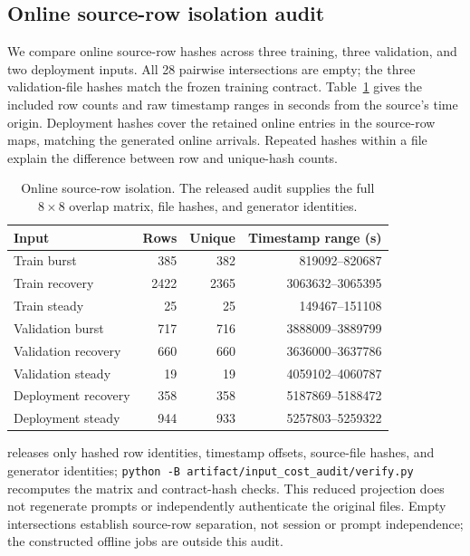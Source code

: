 \subsection{Online source-row isolation audit}
\label{app:input-row-audit}
We compare online source-row hashes across three training, three validation,
and two deployment inputs. All 28 pairwise intersections are empty; the three
validation-file hashes match the frozen training contract. Table~\ref{tab:input-row-audit}
gives the included row counts and raw timestamp ranges in seconds from the
source's time origin. Deployment hashes cover the retained online entries in the source-row maps,
matching the generated online arrivals. Repeated hashes within
a file explain the difference between row and unique-hash counts.

\begin{table}[t]
\centering\small
\caption{Online source-row isolation. The released audit supplies the full
$8\times8$ overlap matrix, file hashes, and generator identities.}
\label{tab:input-row-audit}
\setlength{\tabcolsep}{2pt}
\par\vspace{4pt}
\begin{tabular*}{\linewidth}{@{\extracolsep{\fill}}lrrr@{}}
\toprule
Input & Rows & Unique & Timestamp range (s)\\
\midrule
Train burst & 385 & 382 & 819092--820687 \\
Train recovery & 2422 & 2365 & 3063632--3065395 \\
Train steady & 25 & 25 & 149467--151108 \\
Validation burst & 717 & 716 & 3888009--3889799 \\
Validation recovery & 660 & 660 & 3636000--3637786 \\
Validation steady & 19 & 19 & 4059102--4060787 \\
Deployment recovery & 358 & 358 & 5187869--5188472 \\
Deployment steady & 944 & 933 & 5257803--5259322 \\
\bottomrule
\end{tabular*}
\end{table}

 releases only hashed row
identities, timestamp offsets, source-file hashes, and generator identities;
\texttt{python -B artifact/input\_cost\_audit/verify.py} recomputes the matrix
and contract-hash checks. This reduced projection does not regenerate prompts
or independently authenticate the original files. Empty intersections establish
source-row separation, not session or prompt independence; the constructed
offline jobs are outside this audit.

